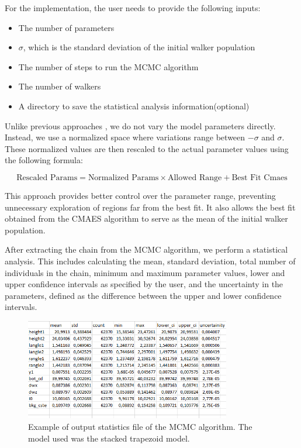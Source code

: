 \medskip

For the implementation, the user needs to provide the following inputs:
\begin{itemize}
    \item The number of parameters
    \item $\sigma$, which is the standard deviation of the initial walker population
    \item The number of steps to run the MCMC algorithm
    \item The number of walkers
    \item A directory to save the statistical analysis information(optional)
\end{itemize}

\medskip

Unlike previous approaches \cite{sunday2016evaluation}, we do not vary the model parameters directly.
 Instead, we use a normalized space where variations range between $-\sigma$ and $\sigma$. These 
 normalized values are then rescaled to the actual parameter values using the following formula:

\begin{equation}
    \text{Rescaled Params} = \text{Normalized Params} \times \text{Allowed Range} + \text{Best Fit Cmaes}
\end{equation}

This approach provides better control over the parameter range, preventing unnecessary exploration of 
regions far from the best fit. It also allows the best fit obtained from the CMAES algorithm to serve as the mean of the initial walker population.

\medskip

After extracting the chain from the MCMC algorithm, we perform a statistical analysis. This includes calculating 
the mean, standard deviation, total number of individuals in the chain, minimum and maximum parameter values, lower
 and upper confidence intervals as specified by the user, and the uncertainty in the parameters, defined as the difference between the upper and lower confidence intervals.

\begin{figure}[h]
    \centering
    \includegraphics[width=0.8\textwidth]{images/mcmc_out.png}
    \caption{Example of output statistics file of the MCMC algorithm. The model used was the stacked trapezoid model.}
\end{figure}

